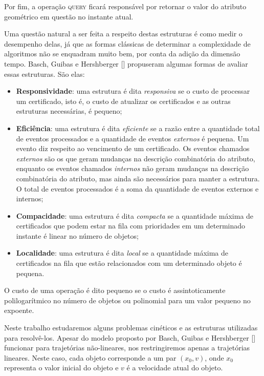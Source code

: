 Por fim, a operação \textsc{query} ficará responsável por retornar o valor do atributo
geométrico em questão no instante atual.

Uma questão natural a ser feita a respeito destas estruturas é como medir o
desempenho delas, já que as formas clássicas de determinar a complexidade de
algoritmos não se enquadram muito bem, por conta da adição da dimensão tempo.
Basch, Guibas e Hershberger [\cite{BASCH19991}] propuseram algumas formas de avaliar essas
estruturas.
São elas:
\begin{itemize}
    \item \textbf{Responsividade}: uma estrutura é dita \textit{responsiva} se o custo de
    processar um certificado, isto é, o custo de atualizar os certificados e as
    outras estruturas necessárias, é pequeno;

    \item \textbf{Eficiência}: uma estrutura é dita \textit{eficiente} se a razão entre a
    quantidade total de eventos processados e a quantidade de eventos
    \textit{externos} é pequena.
    Um evento diz respeito ao vencimento de um certificado.
    Os eventos chamados \textit{externos} são os que geram mudanças na descrição combinatória
    do atributo, enquanto os eventos chamados \textit{internos} não geram mudanças na descrição
    combinatória do atributo, mas ainda são necessários para manter a estrutura.
    O total de eventos processados é a soma da quantidade de eventos externos e internos;

    \item \textbf{Compacidade}: uma estrutura é dita \textit{compacta} se a quantidade máxima de
    certificados que podem estar na fila com prioridades em um determinado instante é linear no
    número de objetos;

    \item \textbf{Localidade}: uma estrutura é dita \textit{local} se a quantidade máxima
    de certificados na fila que estão relacionados com um determinado objeto é
    pequena.
\end{itemize}

O custo de uma operação é dito pequeno se o custo é assintoticamente
polilogarítmico no número de objetos ou polinomial para um valor pequeno no expoente.

Neste trabalho estudaremos alguns problemas cinéticos e as estruturas utilizadas
para resolvê-los.
Apesar do modelo proposto por Basch, Guibas e Hershberger [\cite{BASCH19991}]
funcionar para trajetórias não-lineares, nos restringiremos apenas a trajetórias
lineares.
Neste caso, cada objeto corresponde a um par $(x_0, v)$, onde $x_0$ representa
o valor inicial do objeto e $v$ é a velocidade atual do objeto.

